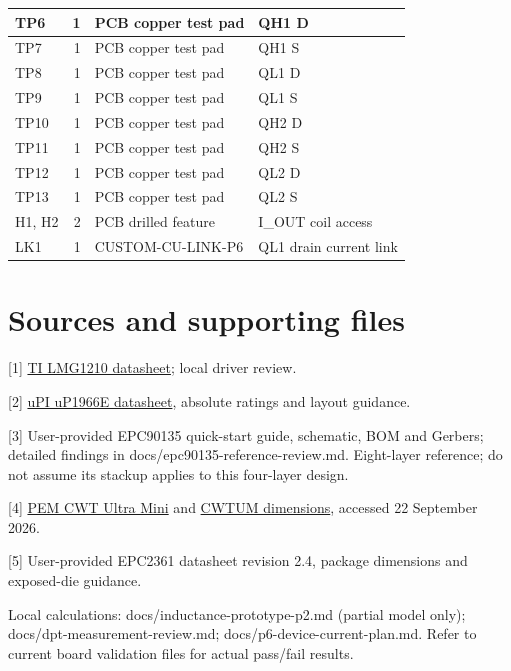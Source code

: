 \documentclass[10pt,a4paper]{article}
\begin{document}
\begin{longtable}{p{.30\linewidth}r p{.31\linewidth}p{.23\linewidth}}
TP6 & 1 & PCB copper test pad & QH1 D \\ \hline
TP7 & 1 & PCB copper test pad & QH1 S \\ \hline
TP8 & 1 & PCB copper test pad & QL1 D \\ \hline
TP9 & 1 & PCB copper test pad & QL1 S \\ \hline
TP10 & 1 & PCB copper test pad & QH2 D \\ \hline
TP11 & 1 & PCB copper test pad & QH2 S \\ \hline
TP12 & 1 & PCB copper test pad & QL2 D \\ \hline
TP13 & 1 & PCB copper test pad & QL2 S \\ \hline
H1, H2 & 2 & PCB drilled feature & I\_OUT coil access \\ \hline
LK1 & 1 & CUSTOM-CU-LINK-P6 & QL1 drain current link \\ \hline
\end{longtable}
\normalsize
\section*{Sources and supporting files}
[1] \href{https://www.ti.com/lit/ds/symlink/lmg1210.pdf}{TI LMG1210 datasheet}; local driver review.

[2] \href{https://epc-co.com/epc/Portals/0/epc/documents/datasheets/uP1966E_datasheet.pdf}{uPI uP1966E datasheet}, absolute ratings and layout guidance.

[3] User-provided EPC90135 quick-start guide, schematic, BOM and Gerbers; detailed findings in docs/epc90135-reference-review.md. Eight-layer reference; do not assume its stackup applies to this four-layer design.

[4] \href{https://www.pemuk.com/products/cwt-range/cwt-ultra-mini}{PEM CWT Ultra Mini} and \href{https://www.pemuk.com/technical-resources/cwtum-dimensions}{CWTUM dimensions}, accessed 22 September 2026.

[5] User-provided EPC2361 datasheet revision 2.4, package dimensions and exposed-die guidance.

Local calculations: docs/inductance-prototype-p2.md (partial model only); docs/dpt-measurement-review.md; docs/p6-device-current-plan.md. Refer to current board validation files for actual pass/fail results.
\clearpage

\end{document}
